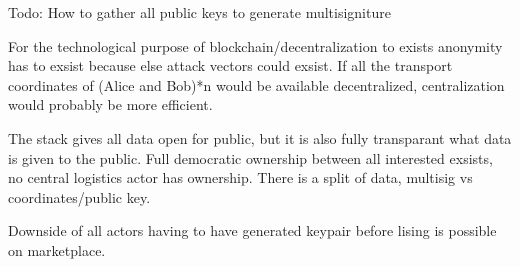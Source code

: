 \documentclass[11pt]{article}
\begin{document}
Todo: How to gather all public keys to generate multisigniture

For the technological purpose of blockchain/decentralization to exists anonymity has to exsist because else attack vectors could exsist. If all the transport coordinates of (Alice and Bob)*n would be available decentralized, centralization would probably be more efficient.

The stack gives all data open for public, but it is also fully transparant what data is given to the public. Full democratic ownership between all interested exsists, no central logistics actor has ownership. There is a split of data, multisig vs coordinates/public key.

Downside of all actors having to have generated keypair before lising is possible on marketplace.



\end{document}
